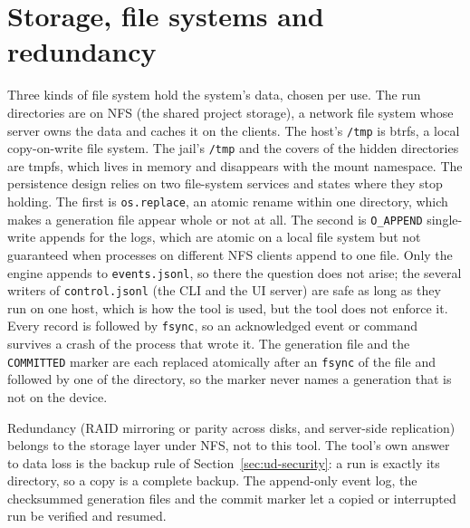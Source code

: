\section{Storage, file systems and redundancy}

Three kinds of file system hold the system's data, chosen per use. The run
directories are on NFS (the shared project storage), a network file system whose
server owns the data and caches it on the clients. The host's \texttt{/tmp} is
btrfs, a local copy-on-write file system. The jail's \texttt{/tmp} and the
covers of the hidden directories are tmpfs, which lives in memory and disappears
with the mount namespace. The persistence design relies on two file-system
services and states where they stop holding. The first is \texttt{os.replace},
an atomic rename within one directory, which makes a generation file appear
whole or not at all. The second is \texttt{O\_APPEND} single-write appends for
the logs, which are atomic on a local file system but not guaranteed when
processes on different NFS clients append to one file. Only the engine appends
to \texttt{events.jsonl}, so there the question does not arise; the several
writers of \texttt{control.jsonl} (the CLI and the UI server) are safe as long
as they run on one host, which is how the tool is used, but the tool does not
enforce it. Every record is followed by \texttt{fsync}, so an acknowledged event
or command survives a crash of the process that wrote it. The generation file
and the \texttt{COMMITTED} marker are each replaced atomically after an
\texttt{fsync} of the file and followed by one of the directory, so the marker
never names a generation that is not on the device.

Redundancy (RAID mirroring or parity across disks, and server-side replication)
belongs to the storage layer under NFS, not to this tool. The tool's own answer
to data loss is the backup rule of Section~\ref{sec:ud-security}: a run is
exactly its directory, so a copy is a complete backup. The append-only event
log, the checksummed generation files and the commit marker let a copied or
interrupted run be verified and resumed.
